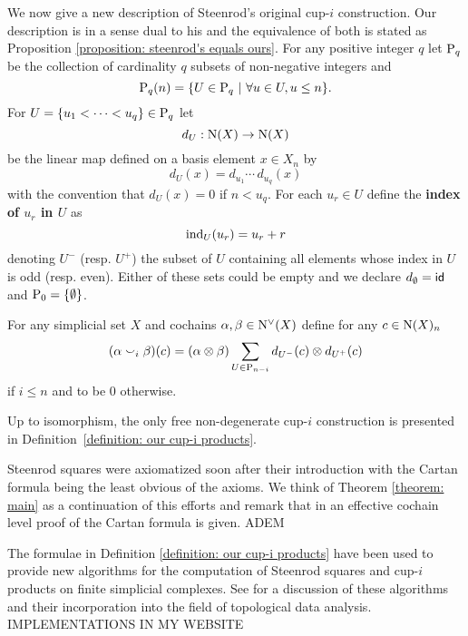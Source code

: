 We now give a new description of Steenrod's original cup-$i$ construction. Our description is in a sense dual to his and the equivalence of both is stated as Proposition \ref{proposition: steenrod's equals ours}. For any positive integer $q$ let $\P_q$ be the collection of cardinality $q$ subsets of non-negative integers and
\[
\P_q(n) = \{ U \in \P_q\ |\ \forall u \in U, u \leq n\}.
\]
 For $U = \{u_1 < \cdots < u_q\} \in \P_q$ let
\[
d_U : \chains(X) \to \chains(X)
\]
be the linear map defined on a basis element $x \in X_n$ by
\[
d_U (x) = d_{u_1} \cdots \, d_{u_q} (x)
\]
with the convention that $d_U(x) = 0$ if $n < u_q$. For each $u_r \in U$ define the \textbf{index of $u_r$ in $U$} as
\[
\ind_U(u_r) = u_r + r
\]
denoting $U^-$ (resp. $U^+$) the subset of $U$ containing all elements whose index in $U$ is odd (resp. even). Either of these sets could be empty and we declare $d_\emptyset = \id$ and $\P_0 = \{\emptyset\}$.

\begin{definition} \label{definition: our cup-i products}
	For any simplicial set $X$ and cochains $\alpha, \beta \in \cochains(X)$ define for any $c \in \chains(X)_n$
	\[
	(\alpha \smallsmile_i \beta)(c) =
	(\alpha \tensor \beta) \sum_{U\in\P_{n-i}} d_{U^-}(c) \tensor d_{U^+}(c)
	\]
	if  $i \leq n$ and to be $0$ otherwise.
\end{definition}

\begin{theorem} \label{theorem: main}
	Up to isomorphism, the only free non-degenerate cup-$i$ construction is presented in \mbox{Definition \ref{definition: our cup-i products}}.
\end{theorem}

\begin{remark}
	Steenrod squares were axiomatized soon after their introduction with the Cartan formula being the least obvious of the axioms. We think of Theorem \ref{theorem: main} as a continuation of this efforts and remark that in \cite{medina2020cartan} an effective cochain level proof of the Cartan formula is given.
	ADEM
\end{remark}

\begin{remark}
	The formulae in Definition \ref{definition: our cup-i products} have been used to provide new algorithms for the computation of Steenrod squares and cup-$i$ products on finite simplicial complexes. See \cite{medina2018persistence} for a discussion of these algorithms and their incorporation into the field of topological data analysis. IMPLEMENTATIONS IN MY WEBSITE
\end{remark}